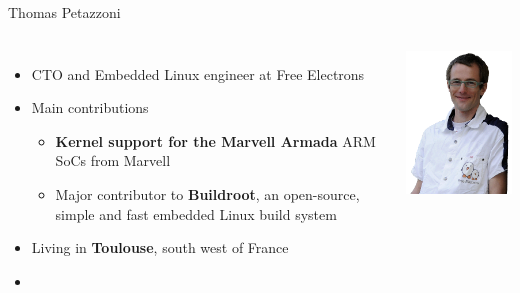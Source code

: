 \begin{frame}{Thomas Petazzoni}
 \begin{columns}
  \begin{itemize}
  \item CTO and Embedded Linux engineer at Free Electrons
  \item Main contributions
    \begin{itemize}
    \item {\bf Kernel support for the Marvell Armada} ARM SoCs from
      Marvell
    \item Major contributor to {\bf Buildroot}, an open-source, simple and
      fast embedded Linux build system
    \end{itemize}
  \item Living in {\bf Toulouse}, south west of France
  \item {}
  \end{itemize}
    \includegraphics[width=\textwidth]{slides/first-slides/thomas-petazzoni.png}
 \end{columns}
\end{frame}


